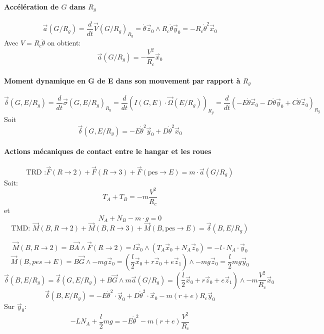 \paragraph{Accélération de $G$ dans $R_g$}
\[\vec a(G/R_g) = \frac{d}{dt}\vec V(G/R_g)_{R_g} = \dot \theta \vec z_0 \wedge R_c \dot \theta \vec y_0 = - R_c \dot \theta^2 \vec x_0\]
Avec $V=R_c \dot \theta$ on obtient:
\begin{equation}
	\vec a(G/R_g) = - \frac{V^2}{R_c} \vec x_0
\end{equation}
\paragraph{Moment dynamique en G de E dans son mouvement par rapport à $R_g$}
\[ \vec \delta (G, E / R_g) = \frac{d}{dt} \vec \sigma (G, E/R_g)_{R_g} = \frac{d}{dt} \left( I(G,E) \cdot \vec \Omega (E / R_g) \right)_{R_g} = \frac{d}{dt} \left( - E \dot \theta \vec x_0 - D \dot \theta \vec y_0 + C \dot \theta \vec z_0 \right)_{R_g} \]
Soit
\begin{equation}
	\vec \delta (G, E/R_g) = -E \dot \theta^2 \vec y_0 + D \dot \theta^2 \vec x_0
\end{equation}
\paragraph{Actions mécaniques de contact entre le hangar et les roues}
\[
	\text{TRD :} \vec F (R \rightarrow 2) + \vec F (R \rightarrow 3) + \vec F(\text{pes} \rightarrow E) = m\cdot \vec a(G/R_g)
\]
Soit:
\begin{equation}
	T_A + T_B = -m \frac{V^2}{R_c}
\end{equation}
et
\begin{equation}
	N_A + N_B - m\cdot g = 0
\end{equation}
\[
	\text{TMD: } \vec M(B,R \rightarrow 2) + \vec M(B,R \rightarrow 3) + \vec M(B, \text{pes} \rightarrow E) = \vec \delta(B,E / R_g)
\]

\[
	\vec M(B,R \rightarrow 2) = B\vec A \wedge \vec F (R \rightarrow 2) = l \vec x_0 \wedge (T_A \vec x_0 + N_A \vec z_0) = -l\cdot N_A \cdot \vec y_0
\]
\[
	\vec M(B, pes \rightarrow E) = B \vec G \wedge -mg\vec z_0 = (\frac{l}{2}\vec x_0 + r\vec z_0 + e \vec z_1)\wedge -mg\vec z_0 = \frac{l}{2}mg\vec y_0
\]
\[
	\vec \delta(B, E/R_g) = \vec \delta(G, E/R_g) + B\vec G \wedge m \vec a(G/R_g) = (\frac{l}{2}\vec x_0 + r\vec z_0 + e\vec z_1) \wedge -m \frac{V^2}{R_c} \vec x_0
\]
\[
	\vec \delta(B,E/R_g) = -E \dot \theta^2 \cdot \vec y_0 + D \dot \theta^2 \cdot \vec x_0 - m(r+e)R_c\vec y_0
\]
Sur $\vec y_0$:
\begin{equation}
	-LN_A + \frac{l}{2}mg = -E \dot \theta^2 - m(r+e)\frac{V^2}{R_c}
\end{equation}

